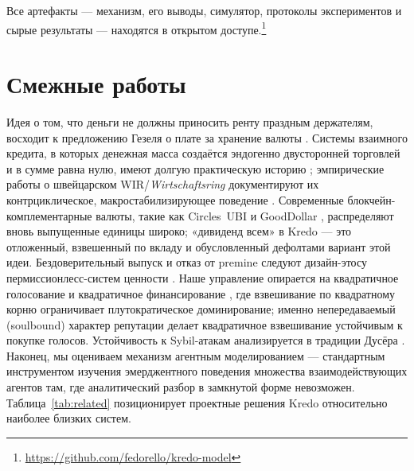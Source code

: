 \documentclass[11pt]{article}
\theoremstyle{plain}
\theoremstyle{definition}
\theoremstyle{remark}
\begin{document}
Все артефакты --- механизм, его выводы, симулятор, протоколы экспериментов и сырые результаты --- находятся в открытом доступе.\footnote{\url{https://github.com/fedorello/kredo-model}}

\section{Смежные работы}\label{sec:related}

Идея о том, что деньги не должны приносить ренту праздным держателям, восходит к предложению Гезеля о плате за хранение валюты \cite{gesell1916}. Системы взаимного кредита, в которых денежная масса создаётся эндогенно двусторонней торговлей и в сумме равна нулю, имеют долгую практическую историю \cite{greco2009}; эмпирические работы о швейцарском WIR/\emph{Wirtschaftsring} документируют их контрциклическое, макростабилизирующее поведение \cite{stodder2009}. Современные блокчейн-комплементарные валюты, такие как Circles~UBI \cite{circles2020} и GoodDollar \cite{gooddollar2021}, распределяют вновь выпущенные единицы широко; «дивиденд всем» в Kredo --- это отложенный, взвешенный по вкладу и обусловленный дефолтами вариант этой идеи. Бездоверительный выпуск и отказ от premine следуют дизайн-этосу пермиссионлесс-систем ценности \cite{nakamoto2008}. Наше управление опирается на квадратичное голосование \cite{lalley2018} и квадратичное финансирование \cite{buterin2019}, где взвешивание по квадратному корню ограничивает плутократическое доминирование; именно непередаваемый (soulbound) характер репутации делает квадратичное взвешивание устойчивым к покупке голосов. Устойчивость к Sybil-атакам анализируется в традиции Дусёра \cite{douceur2002}. Наконец, мы оцениваем механизм агентным моделированием \cite{bonabeau2002} --- стандартным инструментом изучения эмерджентного поведения множества взаимодействующих агентов там, где аналитический разбор в замкнутой форме невозможен. Таблица~\ref{tab:related} позиционирует проектные решения Kredo относительно наиболее близких систем.
\end{document}
